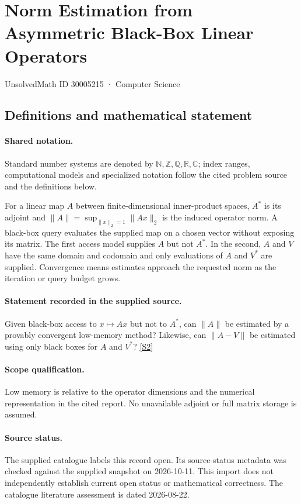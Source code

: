\documentclass[11pt]{article}
\newcommand{\sref}[2]{\hyperlink{source:#1:#2}{[S#2]}}
\begin{document}
\setcounter{section}{30005214}
\section{Norm Estimation from Asymmetric Black-Box Linear Operators}\label{30005215}
{\small\sffamily UnsolvedMath ID 30005215 · Computer Science}
\subsection{Definitions and mathematical statement}

\paragraph{Shared notation.}Standard number systems are denoted by $\mathbb N,\mathbb Z,\mathbb Q,\mathbb R,\mathbb C$; index ranges, computational models and specialized notation follow the cited problem source and the definitions below.


For a linear map $A$ between finite-dimensional inner-product spaces, $A^*$ is its adjoint and $\lVert A\rVert=\sup_{\lVert x\rVert_2=1}\lVert Ax\rVert_2$ is the induced operator norm. A black-box query evaluates the supplied map on a chosen vector without exposing its matrix. The first access model supplies $A$ but not $A^*$. In the second, $A$ and $V$ have the same domain and codomain and only evaluations of $A$ and $V^*$ are supplied. Convergence means estimates approach the requested norm as the iteration or query budget grows.
\paragraph{Statement recorded in the supplied source.}
Given black-box access to $x\mapsto Ax$ but not to $A^*$, can $\lVert A\rVert$ be estimated by a provably convergent low-memory method? Likewise, can $\lVert A-V\rVert$ be estimated using only black boxes for $A$ and $V^*$? \sref{30005215}{2}
\paragraph{Scope qualification.}
Low memory is relative to the operator dimensions and the numerical representation in the cited report. No unavailable adjoint or full matrix storage is assumed.
\paragraph{Source status.}
The supplied catalogue labels this record open. Its source-status metadata was checked against the supplied snapshot on 2026-10-11. This import does not independently establish current open status or mathematical correctness. The catalogue literature assessment is dated 2026-08-22.
\end{document}
